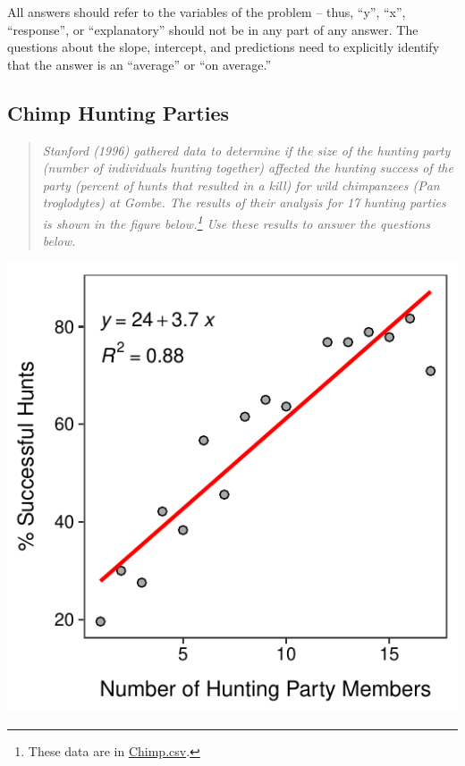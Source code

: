 \documentclass[10pt,openany]{book}\usepackage[]{graphicx}\usepackage[]{color}
\newenvironment{knitrout}{}{} %
\begin{document}
All answers should refer to the variables of the problem -- thus, ``y'', ``x'', ``response'', or ``explanatory'' should not be in any part of any answer. The questions about the slope, intercept, and predictions need to explicitly identify that the answer is an ``average'' or ``on average.''



\vspace{24pt}
\subsection*{Chimp Hunting Parties}
\begin{quote}
\textit{Stanford (1996) gathered data to determine if the size of the hunting party (number of individuals hunting together) affected the hunting success of the party (percent of hunts that resulted in a kill) for wild chimpanzees (Pan troglodytes) at Gombe. The results of their analysis for 17 hunting parties is shown in the figure below.\footnote{These data are in \href{https://raw.githubusercontent.com/droglenc/NCData/master/Chimp.csv}{Chimp.csv}.}  Use these results to answer the questions below.}
\end{quote}

\begin{knitrout}
\color{fgcolor}

{\centering \includegraphics[width=.4\linewidth]{Figs/ChimpFLP-1} 

}



\end{knitrout}
\end{document}
